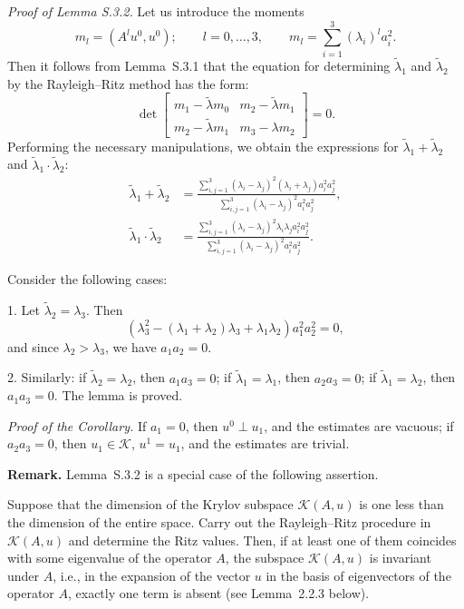 \documentclass[11pt,oneside]{book}
\begin{document}
\textit{Proof of Lemma S.3.2.} Let us introduce the moments
\[
m_l = (A^l u^0, u^0); \qquad l = 0, \dots, 3, \qquad m_l = \sum_{i=1}^3 (\lambda_i)^l a_i^2.
\]
Then it follows from Lemma~S.3.1 that the equation for determining $\tilde{\lambda}_1$ and $\tilde{\lambda}_2$ by the Rayleigh--Ritz method has the form:
\[
\det \begin{bmatrix}
m_1 - \tilde{\lambda} m_0 & m_2 - \tilde{\lambda} m_1 \\
m_2 - \tilde{\lambda} m_1 & m_3 - \lambda m_2
\end{bmatrix} = 0. %
\]
Performing the necessary manipulations, we obtain the expressions for $\tilde{\lambda}_1 + \tilde{\lambda}_2$ and $\tilde{\lambda}_1 \cdot \tilde{\lambda}_2$:
\begin{align*}
\tilde{\lambda}_1 + \tilde{\lambda}_2 &= \frac{\sum_{i,j=1}^3 (\lambda_i - \lambda_j)^2 (\lambda_i + \lambda_j) a_i^2 a_j^2}{\sum_{i,j=1}^3 (\lambda_i - \lambda_j)^2 a_i^2 a_j^2}, \\[1ex]
\tilde{\lambda}_1 \cdot \tilde{\lambda}_2 &= \frac{\sum_{i,j=1}^3 (\lambda_i - \lambda_j)^2 \lambda_i \lambda_j a_i^2 a_j^2}{\sum_{i,j=1}^3 (\lambda_i - \lambda_j)^2 a_i^2 a_j^2}.
\end{align*}

Consider the following cases:

1. Let $\tilde{\lambda}_2 = \lambda_3$. Then
\[
(\lambda_3^2 - (\lambda_1 + \lambda_2)\lambda_3 + \lambda_1 \lambda_2) a_1^2 a_2^2 = 0,
\]
and since $\lambda_2 > \lambda_3$, we have $a_1 a_2 = 0$.

2. Similarly: if $\tilde{\lambda}_2 = \lambda_2$, then $a_1 a_3 = 0$; if $\tilde{\lambda}_1 = \lambda_1$, then $a_2 a_3 = 0$; if $\tilde{\lambda}_1 = \lambda_2$, then $a_1 a_3 = 0$. The lemma is proved.

\textit{Proof of the Corollary.} If $a_1 = 0$, then $u^0 \perp u_1$, and the estimates are vacuous; if $a_2 a_3 = 0$, then $u_1 \in \mathcal{K}$, $u^1 = u_1$, and the estimates are trivial.

\textbf{Remark.} Lemma~S.3.2 is a special case of the following assertion.

Suppose that the dimension of the Krylov subspace $\mathcal{K}(A, u)$ \citep{Parlett1983} is one less than the dimension of the entire space. Carry out the Rayleigh--Ritz procedure in $\mathcal{K}(A, u)$ and determine the Ritz values. Then, if at least one of them coincides with some eigenvalue of the operator $A$, the subspace $\mathcal{K}(A, u)$ is invariant under $A$, i.e., in the expansion of the vector $u$ in the basis of eigenvectors of the operator $A$, exactly one term is absent (see Lemma~2.2.3 below).
\end{document}
